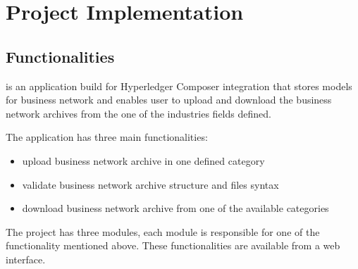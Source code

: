 \chapter{Project Implementation}
\label{chapter:chapter3}

\section{Functionalities}
\label{sub-sec:chapter3-section1}
\textbf{\project} is an application build for Hyperledger Composer integration that stores models for business network and enables user to upload and download the business network archives from the one of the industries fields defined.

The application has three main functionalities:
\begin{itemize}
	\item upload business network archive in one defined category
	\item validate business network archive structure and files syntax
	\item download business network archive from one of the available categories
\end{itemize}
The project has three modules, each module is responsible for one of the functionality mentioned above.
These functionalities are available from a web interface.

